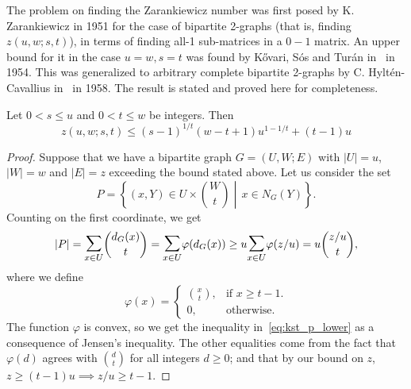 The problem on finding the Zarankiewicz number was first posed by K. Zarankiewicz in 1951 for the
case of bipartite 2-graphs (that is, finding $z(u, w; s, t)$),
in terms of finding all-1 sub-matrices in a $0-1$ matrix.
An upper bound for it in the case $u=w, s=t$ was found by Kővari, Sós and Turán in~\cite{Kovari1954} in 1954.
This was generalized to arbitrary complete
bipartite 2-graphs by C. Hyltén-Cavallius in~\cite{Hylten1958}
in 1958.
The result is stated and proved here for completeness.

\begin{theorem}\label{thm:kst}
    Let $0 < s \leq u$ and $0 < t \leq w$ be integers.
    Then 
    \[z(u, w; s, t) \leq (s - 1)^{1 / t}(w - t + 1)u^{1 - 1 / t} + (t - 1)u\]
    \begin{proof}
        Suppose that we have a bipartite graph $G = (U, W; E)$
        with $|U| = u$, $|W| = w$ and $|E| = z$ exceeding the bound stated above.
        Let us consider the set
        \[
            P = \left\{ (x, Y) \in U \times \binom{W}{t}
            \middle\vert\, x \in N_G(Y) \right\}.
        \]
        Counting on the first coordinate, we get
        \begin{equation} \label{eq:kst_p_lower}
            |P| =
            \mathlarger{\mathlarger{\sum}}_{x \in U} \binom{d_G(x)}{t} =
            \mathlarger{\mathlarger{\sum}}_{x \in U} \varphi(d_G(x)) \geq
            u  \mathlarger{\mathlarger{\sum}}_{x \in U} \varphi(z/u) =
            u \binom{z / u}{t},
        \end{equation}
        where we define
        \[
            \varphi(x) =
            \begin{cases}
                \binom{x}{t}, & \text{if } x \geq t - 1. \\
                0, & \text{otherwise.}
            \end{cases}
        \]
        The function $\varphi$ is convex, so we get the inequality in~\eqref{eq:kst_p_lower}
        as a consequence of Jensen's inequality.
        The other equalities come from the fact that $\varphi(d)$ agrees
        with $\binom{d}{t}$ for all integers $d \geq 0$;
        and that by our bound on $z$, $z \geq (t-1)u \implies z/u \geq t - 1$.


\end{proof}
\end{theorem}

